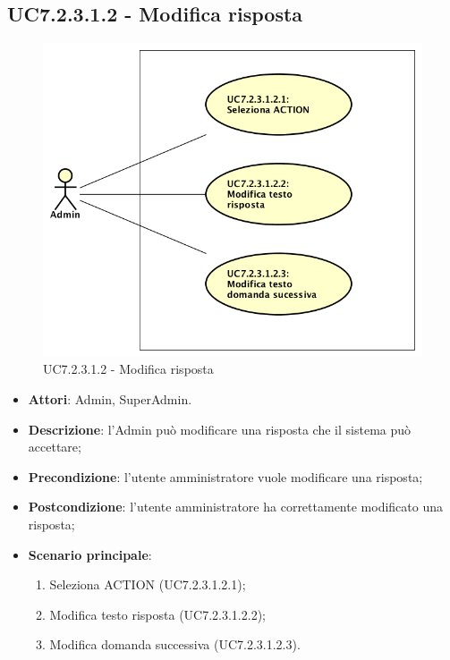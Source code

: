 \documentclass[../AnalisiDeiRequisiti_v3.0.0.tex]{subfiles}
\begin{document}
\subsection{UC7.2.3.1.2 - Modifica risposta} 
\label{sssec:UC7.2.3.1.2} 
\begin{figure}[!h]
	\centering
	\includegraphics[scale=0.7]{UseCases/UC7_GestionePannelloAdmin/UC7_2_GestioneDomande/UC7_2_3_ModificaDomanda/UC7_2_3_1_GestioneRisposte/UC7_2_3_1_2_ModificaRisposta/UC7_2_3_1_2_ModificaRisposta.png}
	\caption{UC7.2.3.1.2 - Modifica risposta}
\end{figure}
\begin{itemize} 
\item \textbf{Attori}: Admin, SuperAdmin.
\item \textbf{Descrizione}: l'Admin può modificare una risposta che il sistema può accettare;
\item \textbf{Precondizione}: l'utente amministratore vuole modificare una risposta;
\item \textbf{Postcondizione}: l'utente amministratore ha correttamente modificato una risposta;
\item \textbf{Scenario principale}: \begin{enumerate}\item Seleziona ACTION (UC7.2.3.1.2.1);\item Modifica testo risposta (UC7.2.3.1.2.2);\item Modifica domanda successiva (UC7.2.3.1.2.3).
\end{enumerate}
\end{itemize} 
\end{document}
